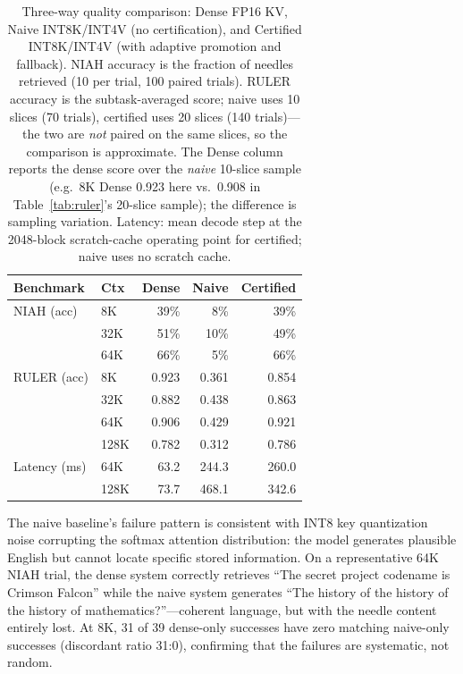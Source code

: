 \documentclass[10pt,twocolumn,a4paper]{article}
\theoremstyle{definition}
\theoremstyle{remark}
\begin{document}
\begin{table}[ht]
\centering
\caption{Three-way quality comparison: Dense FP16 KV, Naive INT8K/INT4V (no certification), and Certified INT8K/INT4V (with adaptive promotion and fallback).  NIAH accuracy is the fraction of needles retrieved (10 per trial, 100 paired trials).  RULER accuracy is the subtask-averaged score; naive uses 10 slices (70 trials), certified uses 20 slices (140 trials)---the two are \emph{not} paired on the same slices, so the comparison is approximate.  The Dense column reports the dense score over the \emph{naive} 10-slice sample (e.g.\ 8K Dense 0.923 here vs.\ 0.908 in Table~\ref{tab:ruler}'s 20-slice sample); the difference is sampling variation.  Latency: mean decode step at the 2048-block scratch-cache operating point for certified; naive uses no scratch cache.}
\label{tab:naive}
\small
\begin{tabular}{@{}llrrr@{}}
\toprule
\textbf{Benchmark} & \textbf{Ctx} & \textbf{Dense} & \textbf{Naive} & \textbf{Certified} \\
\midrule
NIAH (acc)   & 8K   & 39\% & 8\%  & 39\% \\
             & 32K  & 51\% & 10\% & 49\% \\
             & 64K  & 66\% & 5\%  & 66\% \\
\midrule
RULER (acc)  & 8K   & 0.923 & 0.361 & 0.854 \\
             & 32K  & 0.882 & 0.438 & 0.863 \\
             & 64K  & 0.906 & 0.429 & 0.921 \\
             & 128K & 0.782 & 0.312 & 0.786 \\
\midrule
Latency (ms) & 64K  & 63.2  & 244.3 & 260.0 \\
             & 128K & 73.7  & 468.1 & 342.6 \\
\bottomrule
\end{tabular}
\end{table}

The naive baseline's failure pattern is consistent with INT8 key quantization noise corrupting the softmax attention distribution: the model generates plausible English but cannot locate specific stored information.  On a representative 64K NIAH trial, the dense system correctly retrieves ``The secret project codename is Crimson Falcon'' while the naive system generates ``The history of the history of the history of mathematics?''---coherent language, but with the needle content entirely lost.  At 8K, 31 of 39 dense-only successes have zero matching naive-only successes (discordant ratio 31:0), confirming that the failures are systematic, not random.
\end{document}

